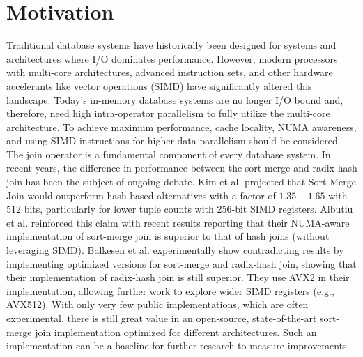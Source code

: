 \section{Motivation}
\label{sec:motivation}

Traditional database systems have historically been designed for systems and architectures where
I/O dominates performance. However, modern processors with multi-core architectures, advanced 
instruction sets, and other hardware accelerants like vector operations (SIMD) have significantly 
altered this landscape. Today's in-memory database systems are no longer I/O bound and, therefore,
need high intra-operator parallelism to fully utilize the multi-core architecture. To achieve
maximum performance, cache locality, NUMA awareness, and using SIMD instructions for higher data
parallelism should be considered.
The join operator is a fundamental component of every database system.
In recent years, the difference in performance between the sort-merge and radix-hash join has been
the subject of ongoing debate. Kim et al. \cite{10.14778/1687553.1687564} projected that Sort-Merge Join would outperform hash-based
alternatives with a factor of $1.35$ – $1.65$ with 512 bits, particularly for lower tuple counts with
256-bit SIMD registers. Albutiu et al. \cite{MPSM} reinforced this claim with recent results reporting that
their NUMA-aware implementation of sort-merge join is superior to that of hash joins (without
leveraging SIMD). Balkesen et al. \cite{Balkesen} experimentally show contradicting results by implementing 
optimized versions for sort-merge and radix-hash join, showing that their implementation of
radix-hash join is still superior. They use AVX2 in their implementation, allowing further
work to explore wider SIMD registers (e.g., AVX512). With only very few public implementations,
which are often experimental, there is still great value in an open-source, state-of-the-art 
sort-merge join implementation optimized for different architectures. Such an implementation can
be a baseline for further research to measure improvements.


